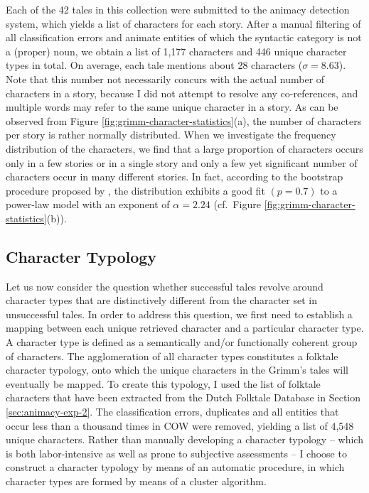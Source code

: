 Each of the 42 tales in this collection were submitted to the animacy detection system, which yields a list of characters for each story. After a manual filtering of all classification errors and animate entities of which the syntactic category is not a (proper) noun, we obtain a list of 1,177 characters and 446 unique character types in total. On average, each tale mentions about 28 characters ($\sigma=8.63$). Note that this number not necessarily concurs with the actual number of characters in a story, because I did not attempt to resolve any co-references, and multiple words may refer to the same unique character in a story. As can be observed from Figure \ref{fig:grimm-character-statistics}(a), the number of characters per story is rather normally distributed. When we investigate the frequency distribution of the characters, we find that a large proportion of characters occurs only in a few stories or in a single story and only a few yet significant number of characters occur in many different stories. In fact, according to the bootstrap procedure proposed by \citeauthor{clauset:2009}, the distribution exhibits a good fit $(p=0.7)$ to a power-law model with an exponent of $\alpha=2.24$ (cf.\ Figure \ref{fig:grimm-character-statistics}(b)).\autocite[See][and Chapter 5 for a more in depth explanation of power-laws and the bootstrap procedure.]{clauset:2009}


\subsection{Character Typology}\label{sec:character-typology}

Let us now consider the question whether successful tales revolve around character types that are distinctively different from the character set in unsuccessful tales. In order to address this question, we first need to establish a mapping between each unique retrieved character and a particular character type. A character type is defined as a semantically and/or functionally coherent group of characters. The agglomeration of all character types constitutes a folktale character typology, onto which the unique characters in the Grimm's tales will eventually be mapped. To create this typology, I used the list of folktale characters that have been extracted from the Dutch Folktale Database in Section \ref{sec:animacy-exp-2}. The classification errors, duplicates and all entities that occur less than a thousand times in COW were removed, yielding a list of 4,548 unique characters. Rather than manually developing a character typology -- which is both labor-intensive as well as prone to subjective assessments -- I choose to construct a character typology by means of an automatic procedure, in which character types are formed by means of a cluster algorithm.

